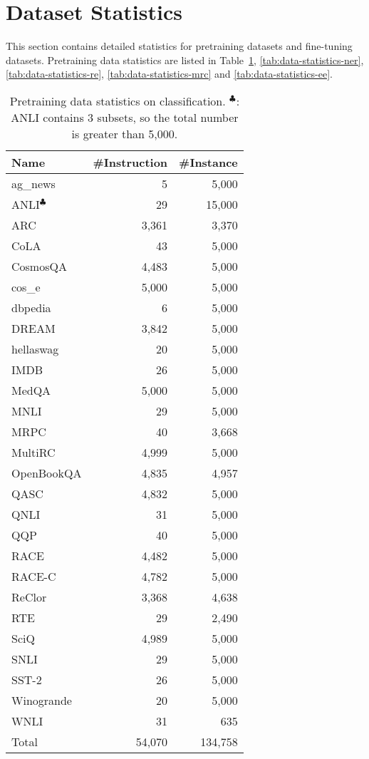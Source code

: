 \appendix
\section{Dataset Statistics}
\label{sec:appendix_data}

This section contains detailed statistics for pretraining datasets and fine-tuning datasets.
Pretraining data statistics are listed in Table~\ref{tab:data-statistics-cls}, \ref{tab:data-statistics-ner}, \ref{tab:data-statistics-re}, \ref{tab:data-statistics-mrc} and \ref{tab:data-statistics-ee}.

\begin{table}
    \centering
    \begin{tabular}[]{lrr}
        \toprule
        Name & \#Instruction & \#Instance \\
        \midrule
        ag\_news & 5 & 5,000 \\
        ANLI$^{\clubsuit}$  & 29 & 15,000 \\
        ARC & 3,361 & 3,370 \\
        CoLA & 43 & 5,000 \\
        CosmosQA & 4,483 & 5,000 \\
        cos\_e & 5,000 & 5,000 \\
        dbpedia & 6 & 5,000 \\
        DREAM & 3,842 & 5,000 \\
        hellaswag & 20 & 5,000 \\
        IMDB & 26 & 5,000 \\
        MedQA & 5,000 & 5,000 \\
        MNLI & 29 & 5,000 \\
        MRPC & 40 & 3,668 \\
        MultiRC & 4,999 & 5,000 \\
        OpenBookQA & 4,835 & 4,957 \\
        QASC & 4,832 & 5,000 \\
        QNLI & 31 & 5,000 \\
        QQP & 40 & 5,000 \\
        RACE & 4,482 & 5,000 \\
        RACE-C & 4,782 & 5,000 \\
        ReClor & 3,368 & 4,638 \\
        RTE & 29 & 2,490 \\
        SciQ & 4,989 & 5,000 \\
        SNLI & 29 & 5,000 \\
        SST-2 & 26 & 5,000 \\
        Winogrande & 20 & 5,000 \\
        WNLI & 31 & 635 \\
        \midrule
        Total & 54,070 & 134,758 \\
        \bottomrule
    \end{tabular}
    \caption{
        Pretraining data statistics on classification.
        $^{\clubsuit}$: ANLI contains 3 subsets, so the total number is greater than 5,000.
    }
    \label{tab:data-statistics-cls}
\end{table}

